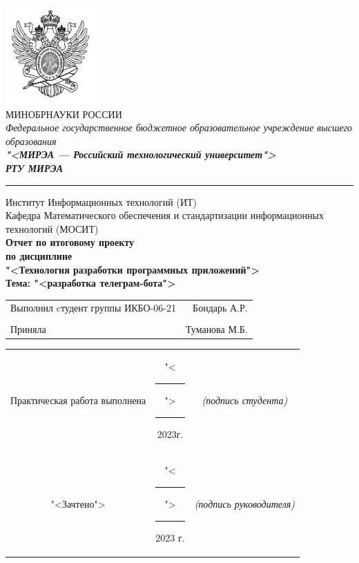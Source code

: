 \begin{titlepage}
	
	\thispagestyle{fancy}
	\renewcommand{\headrulewidth}{0pt}

	\begin{center}
		\includegraphics[scale=0.5]{./res/logo.png}\\
		МИНОБРНАУКИ РОССИИ\\
		\textit{Федеральное государственное бюджетное
		образовательное учреждение высшего образования}\\
		\textbf{\textit{"<МИРЭА --- Российский технологический
		университет">}}\\
		{\large\bfseries\itshape РТУ МИРЭА}\\
		\bigskip \hrule \smallskip
		Институт Информационных технологий (ИТ)\\
		\vfill
		Кафедра Математического обеспечения и стандартизации
		информационных технологий (МОСИТ)\\
		\vfill
		\textbf{
			Отчет по итоговому проекту\\
			по дисциплине\\
			"<Технология разработки программных приложений">\\
			Тема: "<разработка телеграм-бота">\\
		}
		\vfill
		\vfill
		\begin{small}
			\begin{tabular}{lr}
				Выполнил cтудент группы ИКБО-06-21 & Бондарь А.Р.\\\\
				Приняла & Туманова М.Б.\\
			\end{tabular}
		\end{small}
		\vfill
		\begin{footnotesize}
			\begin{tabular}{ccc}
				Практическая  работа выполнена
				& "<\rule{1ex}{.5pt}">\rule{7ex}{.5pt}2023г.
				& \textit{(подпись студента)}\\
				"<Зачтено"> 
				& "<\rule{1ex}{.5pt}">\rule{7ex}{.5pt}2023 г.
				& \textit{(подпись руководителя)}\\
			\end{tabular}
		\end{footnotesize}
		\vfill
	\end{center}
\end{titlepage}
\setcounter{page}{2}
\clearpage

